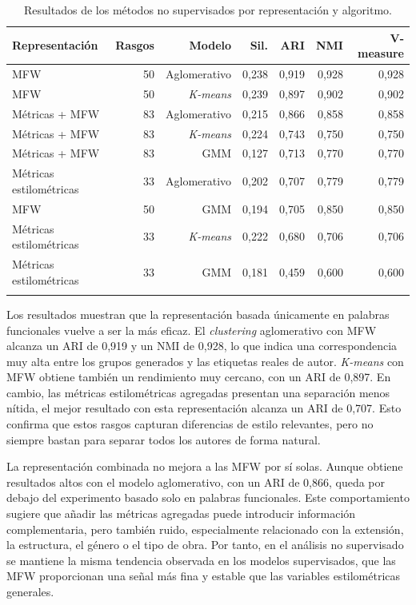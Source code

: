 \documentclass[IB]{TFUOC}%
\begin{document}
\begin{longtable}{|p{4.2cm}|r|r|r|r|r|r|}
\hline
\textbf{Representación} & \textbf{Rasgos} & \textbf{Modelo} & \textbf{Sil.} & \textbf{ARI} & \textbf{NMI} & \textbf{V-measure} \\
\hline
MFW & 50 & Aglomerativo & 0,238 & 0,919 & 0,928 & 0,928 \\
\hline
MFW & 50 & \textit{K-means} & 0,239 & 0,897 & 0,902 & 0,902 \\
\hline
Métricas + MFW & 83 & Aglomerativo & 0,215 & 0,866 & 0,858 & 0,858 \\
\hline
Métricas + MFW & 83 & \textit{K-means} & 0,224 & 0,743 & 0,750 & 0,750 \\
\hline
Métricas + MFW & 83 & GMM & 0,127 & 0,713 & 0,770 & 0,770 \\
\hline
Métricas estilométricas & 33 & Aglomerativo & 0,202 & 0,707 & 0,779 & 0,779 \\
\hline
MFW & 50 & GMM & 0,194 & 0,705 & 0,850 & 0,850 \\
\hline
Métricas estilométricas & 33 & \textit{K-means} & 0,222 & 0,680 & 0,706 & 0,706 \\
\hline
Métricas estilométricas & 33 & GMM & 0,181 & 0,459 & 0,600 & 0,600 \\
\hline
\caption{Resultados de los métodos no supervisados por representación y algoritmo.}
\label{tab:resultados-clustering-general}
\end{longtable}

Los resultados muestran que la representación basada únicamente en palabras funcionales vuelve a ser la más eficaz. El \textit{clustering} aglomerativo con MFW alcanza un ARI de 0,919 y un NMI de 0,928, lo que indica una correspondencia muy alta entre los grupos generados y las etiquetas reales de autor. \textit{K-means} con MFW obtiene también un rendimiento muy cercano, con un ARI de 0,897. En cambio, las métricas estilométricas agregadas presentan una separación menos nítida, el mejor resultado con esta representación alcanza un ARI de 0,707. Esto confirma que estos rasgos capturan diferencias de estilo relevantes, pero no siempre bastan para separar todos los autores de forma natural.

La representación combinada no mejora a las MFW por sí solas. Aunque obtiene resultados altos con el modelo aglomerativo, con un ARI de 0,866, queda por debajo del experimento basado solo en palabras funcionales. Este comportamiento sugiere que añadir las métricas agregadas puede introducir información complementaria, pero también ruido, especialmente relacionado con la extensión, la estructura, el género o el tipo de obra. Por tanto, en el análisis no supervisado se mantiene la misma tendencia observada en los modelos supervisados, que las MFW proporcionan una señal más fina y estable que las variables estilométricas generales.
\end{document}
